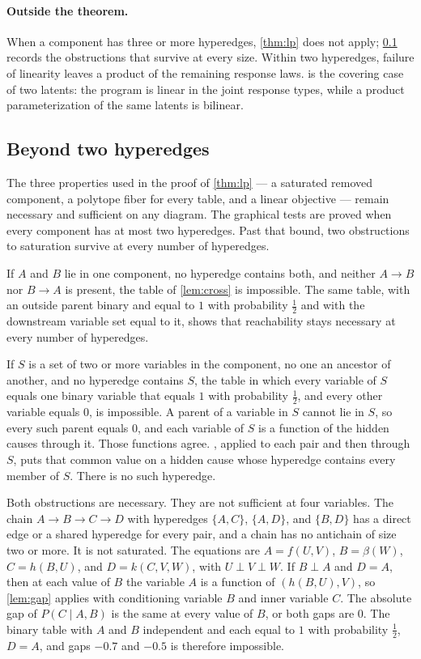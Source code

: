 \paragraph{Outside the theorem.}
When a component has three or more hyperedges, \cref{thm:lp} does not apply;
\cref{app:beyond} records the obstructions that survive at every size.
Within two hyperedges, failure of linearity leaves a product of the remaining
response laws.  is the covering case of two latents: the
program is linear in the joint response types, while a product parameterization
of the same latents is bilinear.


\subsection{Beyond two hyperedges}
\label{app:beyond}

The three properties used in the proof of \cref{thm:lp} --- a saturated removed component, a polytope fiber for every table, and a linear objective --- remain necessary and sufficient on any diagram. The graphical tests are proved when every component has at most two hyperedges. Past that bound, two obstructions to saturation survive at every number of hyperedges.

If $A$ and $B$ lie in one component, no hyperedge contains both, and neither $A\to B$ nor $B\to A$ is present, the table of \cref{lem:cross} is impossible. The same table, with an outside parent binary and equal to $1$ with probability $\tfrac12$ and with the downstream variable set equal to it, shows that reachability stays necessary at every number of hyperedges.

If $S$ is a set of two or more variables in the component, no one an ancestor of another, and no hyperedge contains $S$, the table in which every variable of $S$ equals one binary variable that equals $1$ with probability $\tfrac12$, and every other variable equals $0$, is impossible. A parent of a variable in $S$ cannot lie in $S$, so every such parent equals $0$, and each variable of $S$ is a function of the hidden causes through it. Those functions agree. , applied to each pair and then through $S$, puts that common value on a hidden cause whose hyperedge contains every member of $S$. There is no such hyperedge.

Both obstructions are necessary. They are not sufficient at four variables. The chain $A\to B\to C\to D$ with hyperedges $\{A,C\}$, $\{A,D\}$, and $\{B,D\}$ has a direct edge or a shared hyperedge for every pair, and a chain has no antichain of size two or more. It is not saturated. The equations are $A=f(U,V)$, $B=\beta(W)$, $C=h(B,U)$, and $D=k(C,V,W)$, with $U\perp V\perp W$. If $B\perp A$ and $D=A$, then at each value of $B$ the variable $A$ is a function of $(h(B,U),V)$, so \cref{lem:gap} applies with conditioning variable $B$ and inner variable $C$. The absolute gap of $P(C\mid A,B)$ is the same at every value of $B$, or both gaps are $0$. The binary table with $A$ and $B$ independent and each equal to $1$ with probability $\tfrac12$, $D=A$, and gaps $-0.7$ and $-0.5$ is therefore impossible.

